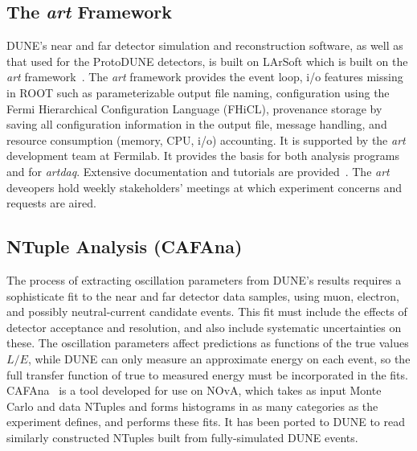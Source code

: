 \subsection{The {\it art} Framework}

DUNE's near and far detector simulation and reconstruction software, as well as that used for the ProtoDUNE
detectors, is built on LArSoft which is built on the {\it art} framework~\cite{art}.  The {\it art} framework
provides the event loop, i/o features missing in ROOT such as parameterizable output file naming, configuration
using the Fermi Hierarchical Configuration Language (FHiCL), provenance storage by saving all configuration
information in the output file, message handling, and resource consumption (memory, CPU, i/o) accounting.  It
is supported by the {\it art} development team at Fermilab.  It provides the basis for both analysis programs
and for {\it artdaq}.  Extensive documentation and tutorials are provided~\cite{artdoc}\cite{arttutorial}.
The {\it art} deveopers hold weekly stakeholders' meetings at which experiment concerns and requests are aired.

\subsection{NTuple Analysis (CAFAna)}

The process of extracting oscillation parameters from DUNE's results requires a sophisticate fit to the near
and far detector data samples, using muon, electron, and possibly neutral-current candidate events.  This fit
must include the effects of detector acceptance and resolution, and also include systematic uncertainties on these.
The oscillation parameters affect predictions as functions of the true values $L/E$, while DUNE can only
measure an approximate energy on each event, so the full transfer function of true to measured energy must be
incorporated in the fits.  CAFAna~\cite{CAFAna} is a tool developed for use on NOvA, which takes as input
Monte Carlo and data NTuples and forms histograms in as many categories as the experiment defines, and performs
these fits.  It has been ported to DUNE to read similarly constructed NTuples built from fully-simulated
DUNE events.
